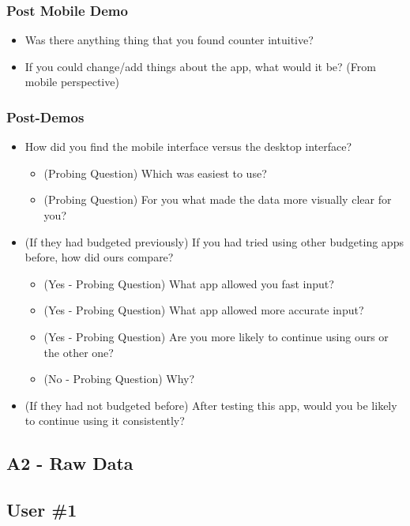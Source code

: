 \documentclass{chi2011}
\begin{document}
	\subsubsection{Post Mobile Demo}
	\begin{itemize}[noitemsep]
		\item Was there anything thing that you found counter intuitive?
		\item If you could change/add things about the app, what would it be? (From mobile perspective)
	\end{itemize}


	\subsubsection{Post-Demos}
	\begin{itemize}[noitemsep]
		\item How did you find the mobile interface versus the desktop interface?
		\begin{itemize}[noitemsep]
			\item (Probing Question) Which was easiest to use?
			\item (Probing Question) For you what made the data more visually clear for you?
		\end{itemize}	
	\item (If they had budgeted previously) If you had tried using other budgeting apps before, how did ours compare?
		\begin{itemize}[noitemsep]
			\item (Yes - Probing Question) What app allowed you fast input?
			\item (Yes - Probing Question) What app allowed more accurate input?
			\item (Yes - Probing Question) Are you more likely to continue using ours or the other one?
			\item (No - Probing Question) Why?
		\end{itemize}
	\item (If they had not budgeted before) After testing this app, would you be likely to continue using it consistently? 
	\end{itemize}
	
	
	\subsection{A2 - Raw Data}
	
	\subsection{User \#1}
\end{document}
